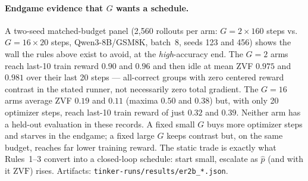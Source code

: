 \paragraph{Endgame evidence that $G$ wants a schedule.} A two-seed
matched-budget panel (2{,}560 rollouts per arm: $G{=}2\times160$ steps
vs.\ $G{=}16\times20$ steps, Qwen3-8B/GSM8K, batch~8, seeds 123 and 456)
shows the wall the rules above exist to avoid, at the \emph{high}-accuracy
end. The $G{=}2$ arms reach last-10 train reward $0.90$ and $0.96$ and then
idle at mean ZVF $0.975$ and $0.981$ over their last 20 steps --- all-correct
groups with zero centered reward contrast in the stated runner, not
necessarily zero total gradient. The $G{=}16$ arms average ZVF $0.19$ and
$0.11$ (maxima $0.50$ and $0.38$) but, with only 20 optimizer steps, reach
last-10 train reward of just $0.32$ and $0.39$. Neither arm has a held-out
evaluation in these records. A fixed small $G$ buys more optimizer steps and
starves in the endgame; a fixed large $G$ keeps contrast but, on the same budget,
reaches far lower training reward. The
static trade is exactly what Rules~1--3 convert into a closed-loop
schedule: start small, escalate as $\hat p$ (and with it
$\mathrm{ZVF}$) rises. Artifacts:
\texttt{tinker-runs/results/er2b\_*.json}.
